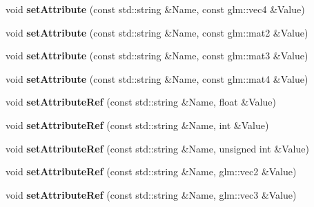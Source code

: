 \begin{DoxyCompactItemize}
\item 
\hypertarget{class_material_a08a66665e05d102fb5b0f2761ea93120}{void {\bfseries set\+Attribute} (const std\+::string \&Name, const glm\+::vec4 \&Value)}\label{class_material_a08a66665e05d102fb5b0f2761ea93120}

\item 
\hypertarget{class_material_afec72a611725bee8af7f3a3f1272bc7f}{void {\bfseries set\+Attribute} (const std\+::string \&Name, const glm\+::mat2 \&Value)}\label{class_material_afec72a611725bee8af7f3a3f1272bc7f}

\item 
\hypertarget{class_material_abba9a9832c1cf8feab2d81638340e2ff}{void {\bfseries set\+Attribute} (const std\+::string \&Name, const glm\+::mat3 \&Value)}\label{class_material_abba9a9832c1cf8feab2d81638340e2ff}

\item 
\hypertarget{class_material_a85e589886b3c6dd9e4dea1c2c70e1923}{void {\bfseries set\+Attribute} (const std\+::string \&Name, const glm\+::mat4 \&Value)}\label{class_material_a85e589886b3c6dd9e4dea1c2c70e1923}

\item 
\hypertarget{class_material_a8d121bc8fbc044b6b7525036df030389}{void {\bfseries set\+Attribute\+Ref} (const std\+::string \&Name, float \&Value)}\label{class_material_a8d121bc8fbc044b6b7525036df030389}

\item 
\hypertarget{class_material_a1ee0f946b87a4adb37b345e460f36d08}{void {\bfseries set\+Attribute\+Ref} (const std\+::string \&Name, int \&Value)}\label{class_material_a1ee0f946b87a4adb37b345e460f36d08}

\item 
\hypertarget{class_material_a0eafda29b666434628edf39dc8d2375c}{void {\bfseries set\+Attribute\+Ref} (const std\+::string \&Name, unsigned int \&Value)}\label{class_material_a0eafda29b666434628edf39dc8d2375c}

\item 
\hypertarget{class_material_aecd05c2ddea2b5b0558d566d8cd18410}{void {\bfseries set\+Attribute\+Ref} (const std\+::string \&Name, glm\+::vec2 \&Value)}\label{class_material_aecd05c2ddea2b5b0558d566d8cd18410}

\item 
\hypertarget{class_material_a82e432d1e1246fdc57bd026020a5c6e5}{void {\bfseries set\+Attribute\+Ref} (const std\+::string \&Name, glm\+::vec3 \&Value)}\label{class_material_a82e432d1e1246fdc57bd026020a5c6e5}


\end{DoxyCompactItemize}

